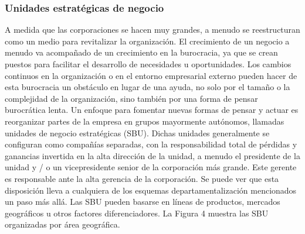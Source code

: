 \documentclass[10pt]{book}
\begin{document}
\subsubsection{Unidades estratégicas de negocio}
A medida que las corporaciones se hacen muy grandes, a menudo se reestructuran como un medio para revitalizar la organización. El crecimiento de un negocio a menudo va acompañado de un crecimiento en la burocracia, ya que se crean puestos para facilitar el desarrollo de necesidades u oportunidades. Los cambios continuos en la organización o en el entorno empresarial externo pueden hacer de esta burocracia un obstáculo en lugar de una ayuda, no solo por el tamaño o la complejidad de la organización, sino también por una forma de pensar burocrática lenta. Un enfoque para fomentar nuevas formas de pensar y actuar es reorganizar partes de la empresa en grupos mayormente autónomos, llamadas unidades de negocio estratégicas (SBU). Dichas unidades generalmente se configuran como compañías separadas, con la responsabilidad total de pérdidas y ganancias invertida en la alta dirección de la unidad, a menudo el presidente de la unidad y / o un vicepresidente senior de la corporación más grande. Este gerente es responsable ante la alta gerencia de la corporación. Se puede ver que esta disposición lleva a cualquiera de los esquemas departamentalización mencionados un paso más allá. Las SBU pueden basarse en líneas de productos, mercados geográficos u otros factores diferenciadores. La Figura 4 muestra las SBU organizadas por área geográfica.
\end{document}
